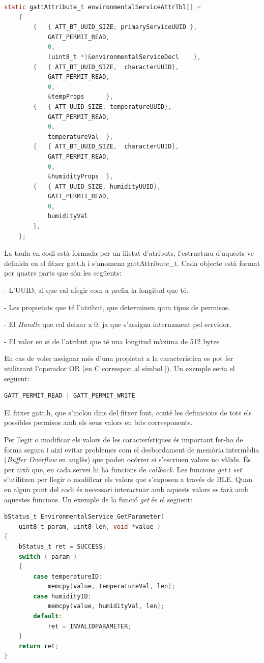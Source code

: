 \begin{lstlisting}[language=C]
	static gattAttribute_t environmentalServiceAttrTbl[] =
	{
		{	{ ATT_BT_UUID_SIZE, primaryServiceUUID },
			GATT_PERMIT_READ,
			0,
			(uint8_t *)&environmentalServiceDecl	},
		{	{ ATT_BT_UUID_SIZE,  characterUUID},
			GATT_PERMIT_READ,
			0,
			&tempProps		},
		{	{ ATT_UUID_SIZE, temperatureUUID},
			GATT_PERMIT_READ,
			0,
			temperatureVal	},
		{	{ ATT_BT_UUID_SIZE,  characterUUID},
			GATT_PERMIT_READ,
			0,
			&humidityProps	},
		{	{ ATT_UUID_SIZE, humidityUUID},
			GATT_PERMIT_READ,
			0,
			humidityVal
		},
	};
\end{lstlisting}

La taula en codi està formada per un llistat d'atributs, l'estructura d'aquests ve definida en el fitxer gatt.h i s'anomena gattAttribute\_t.
Cada objecte està format per quatre parts que són les següents:

- L'UUID, al que cal afegir com a prefix la longitud que té.

- Les propietats que té l'atribut, que determinen quin tipus de permisos.

- El \textit{Handle} que cal deixar a 0, ja que s'assigna internament pel servidor.

- El valor en si de l'atribut que té una longitud màxima de 512 bytes
\newline

En cas de voler assignar més d'una propietat a la característica es pot fer utilitzant l'operador OR (en C correspon al símbol $\mid$).
Un exemple seria el següent: 
\begin{lstlisting}[language=C]
GATT_PERMIT_READ | GATT_PERMIT_WRITE
\end{lstlisting}
El fitxer gatt.h, que s'inclou dins del fitxer font, conté les definicions de tots els possibles permisos amb els seus valors en bits corresponents.

Per llegir o modificar els valors de les característiques és important fer-ho de forma segura i així evitar problemes com el desbordament de memòria intermèdia (\textit{Buffer Overflow} en anglès) que poden ocórrer si s'escriuen valors no vàlids.
És per això que, en cada servei hi ha funcions de \textit{callback}.
Les funcions \textit{get} i \textit{set} s'utilitzen per llegir o modificar els valors que s'exposen a través de BLE.
Quan en algun punt del codi és necessari interactuar amb aquests valors es farà amb aquestes funcions.
Un exemple de la funció \textit{get} és el següent:

\begin{lstlisting}[language=C]
bStatus_t EnvironmentalService_GetParameter(
	uint8_t param, uint8 len, void *value )
{
	bStatus_t ret = SUCCESS;
	switch ( param )
	{
		case temperatureID:
			memcpy(value, temperatureVal, len);
		case humidityID:
			memcpy(value, humidityVal, len);
		default:
			ret = INVALIDPARAMETER;
	}
	return ret;
}
\end{lstlisting}

